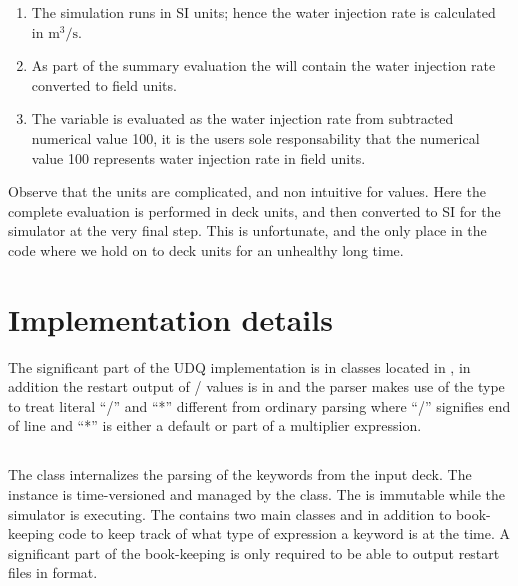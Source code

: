 \begin{enumerate}
\item The simulation runs in SI units; hence the water injection rate is
  calculated in $\mathrm{m^3/s}$.
\item As part of the summary evaluation the  will
  contain the water injection rate converted to field units.
\item The \udq{} variable  is evaluated as the water injection rate from
   subtracted numerical value 100, it is the users sole
  responsability that the numerical value 100 represents water injection rate in
  field units.
\end{enumerate}

Observe that the units are complicated, and non intuitive for  values.
Here the complete evaluation is performed in deck units, and then converted to
SI for the simulator at the very final step. This is unfortunate, and the only
place in the code where we hold on to deck units for an unhealthy long time.


\section{Implementation details}
The significant part of the UDQ implementation is in classes located in
, in addition the restart output of
\udq{}/ values is in  and
the \udq{} parser makes use of the type  to treat literal
``/'' and ``*'' different from ordinary parsing where ``/'' signifies end of
line and ``*'' is either a default or part of a multiplier expression.

\subsection*{}
The class  internalizes the parsing of the \udq{} keywords
from the input deck. The  instance is time-versioned and
managed by the  class. The  is
immutable while the simulator is executing. The  contains
two main classes  and  in addition
to book-keeping code to keep track of what type of expression a \udq{} keyword
is at the time. A significant part of the book-keeping is only required to be
able to output restart files in \eclipse{} format.

